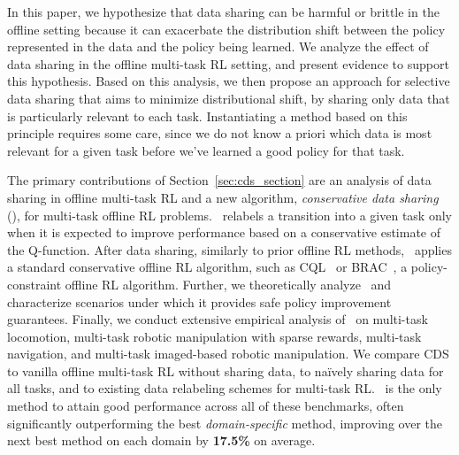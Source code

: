 \documentclass[../thesis.tex]{subfiles}
\begin{document}
In this paper, we hypothesize that data sharing can be harmful or brittle in the offline setting because it can exacerbate the distribution shift between the policy represented in the data and the policy being learned. 
We analyze the effect of data sharing in the offline multi-task RL setting, and present evidence to support this hypothesis.
Based on this analysis, we then propose an approach for selective data sharing that aims to minimize distributional shift, by sharing only data that is particularly relevant to each task. Instantiating a method based on this principle requires some care, since we do not know a priori which data is most relevant for a given task before we've learned a good policy for that task.

\fi


The primary contributions of Section~\ref{sec:cds_section} are an analysis of data sharing in offline multi-task RL and a new algorithm, \textit{conservative data sharing} (\cdsmethodname), for multi-task offline RL problems. {\cdsmethodname\ relabels a transition into a given task only when it is expected to improve performance based on a conservative estimate of the Q-function.} 
After data sharing, similarly to prior offline RL methods, \cdsmethodname\ applies a standard conservative offline RL algorithm, such as CQL~\citep{kumar2020conservative} or BRAC~\citep{wu2019behavior}, a policy-constraint offline RL algorithm. Further, we theoretically analyze \cdsmethodname\ and characterize scenarios under which it provides safe policy improvement guarantees. Finally, we conduct extensive empirical analysis of \cdsmethodname\ on multi-task locomotion, multi-task robotic manipulation with sparse rewards, multi-task navigation, and multi-task imaged-based robotic manipulation. We compare CDS to vanilla offline multi-task RL without sharing data, to na\"{i}vely sharing data for all tasks, and to existing data relabeling schemes for multi-task RL. \cdsmethodname\ is the only method to attain good performance across all of these benchmarks, often significantly outperforming the best \textit{domain-specific} method, improving over the next best method on each domain by \textbf{17.5\%} on average.
\end{document}
